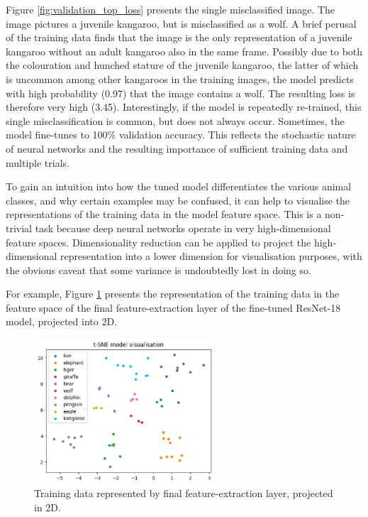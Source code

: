 Figure \ref{fig:validation_top_loss} presents the single misclassified image. The image pictures a juvenile kangaroo, but is misclassified as a wolf. A brief perusal of the training data finds that the image is the only representation of a juvenile kangaroo without an adult kangaroo also in the same frame. Possibly due to both the colouration and hunched stature of the juvenile kangaroo, the latter of which is uncommon among other kangaroos in the training images, the model predicts with high probability (0.97) that the image contains a wolf. The resulting loss is therefore very high (3.45). Interestingly, if the model is repeatedly re-trained, this single misclassification is common, but does not always occur. Sometimes, the model fine-tunes to 100\% validation accuracy. This reflects the stochastic nature of neural networks and the resulting importance of sufficient training data and multiple trials.

To gain an intuition into how the tuned model differentiates the various animal classes, and why certain examples may be confused, it can help to visualise the representations of the training data in the model feature space. This is a non-trivial task because deep neural networks operate in very high-dimensional feature spaces. Dimensionality reduction can be applied to project the high-dimensional representation into a lower dimension for visualisation purposes, with the obvious caveat that some variance is undoubtedly lost in doing so.

For example, Figure \ref{fig:tsne} presents the representation of the training data in the feature space of the final feature-extraction layer of the fine-tuned ResNet-18 model, projected into 2D.

\begin{figure}[ht]
  \centering
  \includegraphics[width=0.6\textwidth]{images/q2_tsne.png}
  \caption{Training data represented by final feature-extraction layer, projected in 2D.}
  \label{fig:tsne}
\end{figure}

